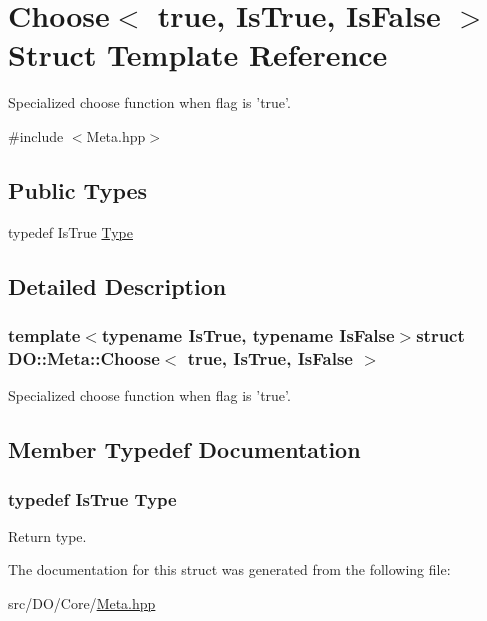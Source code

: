 \hypertarget{struct_d_o_1_1_meta_1_1_choose_3_01true_00_01_is_true_00_01_is_false_01_4}{\section{Choose$<$ true, Is\-True, Is\-False $>$ Struct Template Reference}
\label{struct_d_o_1_1_meta_1_1_choose_3_01true_00_01_is_true_00_01_is_false_01_4}
}


Specialized choose function when flag is 'true'.  




{\ttfamily \#include $<$Meta.\-hpp$>$}

\subsection*{Public Types}
\begin{DoxyCompactItemize}
\item 
typedef Is\-True \hyperlink{struct_d_o_1_1_meta_1_1_choose_3_01true_00_01_is_true_00_01_is_false_01_4_ab020b2d70649b728f2bab8fc98ba4cd9}{Type}
\end{DoxyCompactItemize}


\subsection{Detailed Description}
\subsubsection*{template$<$typename Is\-True, typename Is\-False$>$struct D\-O\-::\-Meta\-::\-Choose$<$ true, Is\-True, Is\-False $>$}

Specialized choose function when flag is 'true'. 

\subsection{Member Typedef Documentation}
\hypertarget{struct_d_o_1_1_meta_1_1_choose_3_01true_00_01_is_true_00_01_is_false_01_4_ab020b2d70649b728f2bab8fc98ba4cd9}{
\subsubsection[{Type}]{\setlength{\rightskip}{0pt plus 5cm}typedef Is\-True {\bf Type}}}\label{struct_d_o_1_1_meta_1_1_choose_3_01true_00_01_is_true_00_01_is_false_01_4_ab020b2d70649b728f2bab8fc98ba4cd9}
Return type. 

The documentation for this struct was generated from the following file\-:\begin{DoxyCompactItemize}
\item 
src/\-D\-O/\-Core/\hyperlink{_meta_8hpp}{Meta.\-hpp}\end{DoxyCompactItemize}
